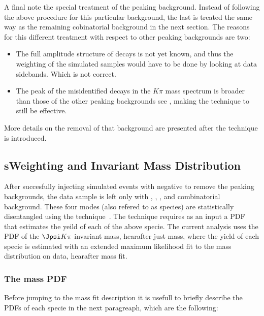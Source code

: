 A final note the special treatment of the \LbJpsippi peaking background. Instead of following the above procedure for this
particular background, the last is treated the same way as the remaining cobinatorial background in the next section.
The reasons for this different treatment with respect to other peaking backgrounds are two:
\begin{itemize}
\item The full amplitude structure of \LbJpsippi decays is not yet known, and thus the weighting of the simulated samples 
      would have to be done by looking at data sidebands. Which is not correct.
\item The peak of the misidentified \LbJpsippi decays in the \Jpsi$K\pi$ mass spectrum is broader than those of the other
      peaking backgrounds see , making the \sPlot technique to still be effective.  
\end{itemize}
More details on the removal of that background are presented after the \sPlot technique is introduced.

\subsection{sWeighting and Invariant Mass Distribution}
\label{sWeighting_and_mass}

After succesfully injecting simulated events with negative to remove the peaking backgrounds, the data sample is left only with
\BdJpsiKpi, \BsJpsiKpi, \LbJpsippi, and combinatorial background. These four modes (also refered to as species) are statistically 
disentangled using the \sPlot technique~\cite{splot}. The technique requires as an input a PDF that estimates the yeild of each 
of the above specie. The current analysis uses the PDF of the $\Jpsi K\pi$ invariant mass, hearafter just mass, where the yield of each specie
is estimated with an extended maximum likelihood fit to the mass distribution on data, hearafter mass fit. 

\subsubsection{The mass PDF}
Before jumping to the mass fit description it is usefull to briefly describe the PDFs of each specie in the next paragreaph, which are the following:  

